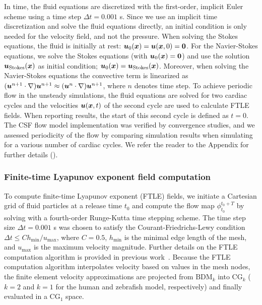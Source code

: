 \documentclass{template}
\begin{document}
In time, the fluid equations are discretized with the first-order, implicit
Euler scheme using a time step $\Delta t = 0.001$ s.
Since we use an implicit time discretization and solve the fluid equations
directly, an initial condition is only needed
for the velocity field, and not the pressure.
When solving the Stokes equations, the fluid is 
initially at rest: $\bm{u}_0(\bm{x})=\bm{u}(\bm{x}, 0)=\bm{0}$.
For the Navier-Stokes equations, we solve the Stokes equations
(with $\bm{u}_0(\bm{x})=\bm{0}$) and use the solution
$\bm{u}_{\mathrm{Stokes}}(\bm{x})$ as initial condition;
$\bm{u}_0(\bm{x})=\bm{u}_{\mathrm{Stokes}}(\bm{x})$. 
Moreover, when solving the Navier-Stokes equations the convective term
is linearized as $(\bm{u}^{n+1}\cdot\nabla)\bm{u}^{n+1} \approx (\bm{u}^n\cdot\nabla)\bm{u}^{n+1}$,
where $n$ denotes time step.
To achieve periodic flow in the unsteady simulations, the fluid equations
are solved for two cardiac cycles and the velocities $\bm{u}(\bm{x}, t)$
of the second cycle are used to calculate FTLE fields.
When reporting results, the start of this second cycle is defined as $t=0$.
The CSF flow model implementation was verified by convergence studies, and we
assessed periodicity of the flow by comparing simulation results when simulating
for a various number of cardiac cycles. We refer the reader to the Appendix for
further details ().

\subsubsection{Finite-time Lyapunov exponent field computation}
To compute finite-time Lyapunov exponent (FTLE) fields,
we initiate a Cartesian grid of fluid particles at a release
time $t_0$ and compute the flow map $\phi_{t_0}^{t_0+T}$
by solving  with a fourth-order Runge-Kutta 
time stepping scheme. The time step size $\Delta t = 0.001$ s
was chosen to satisfy the Courant-Friedrichs-Lewy condition
$\Delta t \leq C h_{\mathrm{min}}/u_{\mathrm{max}}$,
where $C=0.5$, $h_{\mathrm{min}}$ is the minimal edge length
of the mesh, and $u_{\mathrm{max}}$ is
the maximum velocity magnitude. Further details on the
FTLE computation algorithm is provided in previous work~\citep{shadden2010computational}.
Because the FTLE computation algorithm interpolates velocity
based on values in the mesh nodes, the finite element velocity
approximations are projected from $\mathrm{BDM}_k$ into
$\mathrm{CG}_k$ ($k=2$ and $k=1$ for the human and zebrafish model, respectively)
and finally evaluated in a $\mathrm{CG}_1$ space.
\end{document}
